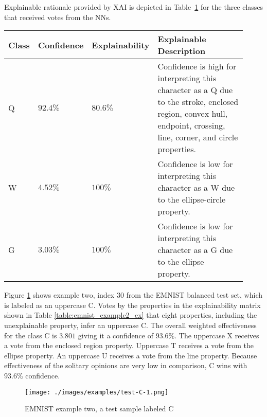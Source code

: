 Explainable rationale provided by XAI is depicted in
Table~\ref{table:emnist_example1_explanation} for the three classes that received
votes from the NNs.

\begin{table}[H]
    \renewcommand{\arraystretch}{1.3}
     \label{table:emnist_example1_explanation}
    \begin{tabular}{| m{0.06\linewidth} | m{0.14\linewidth} | m{0.17\linewidth} | m{0.55\linewidth} |}
    \hline
     Class & Confidence & Explainability & Explainable Description \\
    \hline \hline
    Q & $92.4\%$ & $80.6\%$ & Confidence is high for interpreting this character as a Q due to the stroke, enclosed region, convex hull, endpoint, crossing, line, corner, and circle properties. \\ 
    \hline
    W & $4.52\%$ & $100\%$ & Confidence is low for interpreting this character as a W due to the ellipse-circle property. \\
    \hline
    G & $3.03\%$ & $100\%$ & Confidence is low for interpreting this character as a G due to the ellipse property. \\
    \hline
    \end{tabular}
\end{table}

Figure \ref{fig:ex2} shows example two, index 30 from the EMNIST balanced test
set, which is labeled as an uppercase C. Votes by the properties in the
explainability matrix shown in Table \ref{table:emnist_example2_ex} that eight
properties, including the unexplainable property, infer an uppercase C. The
overall weighted effectiveness for the class C is $3.801$ giving it a confidence
of $93.6\%$. The uppercase X receives a vote from the enclosed region property.
Uppercase T receives a vote from the ellipse property. An uppercase U receives a
vote from the line property.  Because effectiveness of the solitary opinions are
very low in comparison, C wins with $93.6\%$ confidence.

\begin{figure}[H]
    \centering
    \texttt{[image: ./images/examples/test-C-1.png]}
    \caption{EMNIST example two, a test sample labeled C}
    \label{fig:ex2}
\end{figure}


